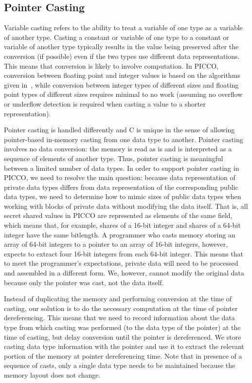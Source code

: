\documentclass[11pt]{article}
\begin{document}
\subsection{Pointer Casting}

Variable casting refers to the ability to treat a variable of one type as a
variable of another type. Casting a constant or variable of one type to a
constant or variable of another type typically results in the value being
preserved after the conversion (if possible) even if the two types use
different data representations. This means that conversion is likely to
involve computation. In PICCO, conversion between floating point and integer
values is based on the algorithms given in~\cite{ali13}, while conversion
between integer types of different sizes and floating point types of
different sizes requires minimal to no work (assuming no overflow or
underflow detection is required when casting a value to a shorter
representation).

Pointer casting is handled differently and C is unique in the sense of
allowing pointer-based in-memory casting from one data type to another.
Pointer casting involves no data conversion: the memory is read as is and is
interpreted as a sequence of elements of another type. Thus, pointer casting
is meaningful between a limited number of data types. In order to support
pointer casting in PICCO, we need to resolve the main question: because data
representation of private data types differs from data representation of the
corresponding public data types, we need to determine how to mimic sizes of
public data types when working with blocks of private data without modifying
the data itself. That is, all secret shared values in PICCO are represented
as elements of the same field, which means that, for example, shares of a
16-bit integer and shares of a 64-bit integer have the same bitlength. A
programmer who casts memory storing an array of 64-bit integers to a pointer
to an array of 16-bit integers, however, expects to extract four 16-bit
integers from each 64-bit integer. This means that to meet the programmer's
expectations, private data will need to be processed and assembled in a
different form. We, however, cannot modify the original data because only
the pointer was cast, not the data itself.

Instead of duplicating the memory and performing conversion at the
time of casting, our solution is to do the necessary computation at
the time of pointer dereferencing. This means that we need to record
information about the data type from which casting was performed (to
the data type of the pointer) at the time of casting, but delay
conversion until the pointer is dereferenced. We store casting data
type information with the pointer and use it to extract the relevant
portion of the memory at pointer dereferencing time. Note that in
presence of a sequence of casts, only a single data type needs to be
maintained because the memory layout does not change. 
\end{document}

